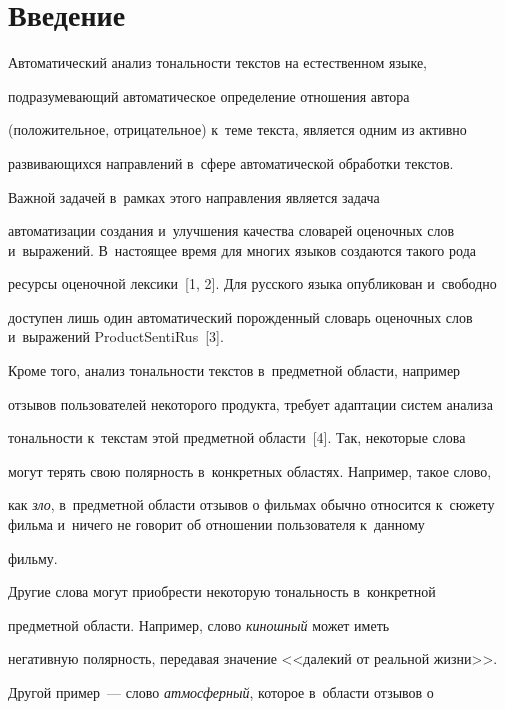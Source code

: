 \section{Введение}





     Автоматический анализ тональности текстов на естественном языке,


подразумевающий автоматическое определение отношения автора


(положительное, отрицательное) к~теме текста, является одним из активно


развивающихся на\-прав\-ле\-ний в~сфере автоматической обработки текстов.





     Важной задачей в~рамках этого направления является задача


автоматизации создания и~улучшения качества словарей оценочных слов и~выражений. В~настоящее время для многих языков создаются такого рода


ресурсы оценочной лексики~[1, 2]. Для русского языка опубликован и~свободно


доступен лишь один автоматический порожденный словарь оценочных слов и~выражений ProductSentiRus~[3].





     Кроме того, анализ тональности текстов в~предметной области, например


отзывов пользователей некоторого продукта, требует адаптации систем анализа


тональности к~текстам этой предметной области~[4]. Так, некоторые слова


могут терять свою полярность в~конкретных областях. Например, такое слово,


как \textit{зло}, в~предметной области отзывов о фильмах обычно относится к~сюжету фильма и~ничего не говорит об отношении пользователя к~данному


фильму.





     Другие слова могут приобрести некоторую тональность в~конкретной


предметной области. Например, слово \textit{киношный} может иметь


негативную полярность, передавая значение <<далекий от реальной жизни>>.


Другой пример~--- слово \textit{атмосферный}, которое в~области отзывов о


